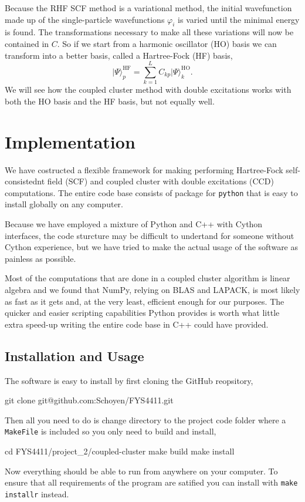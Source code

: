 \documentclass[
    a4paper, aps, twocolumn, floatfix, superscriptaddress,
    nofootinbib]{revtex4-1}
\newcommand{\1}{\mathds{1}}
\newcommand{\ket}[1]{\rvert #1\rangle}
\begin{document}
            Because the RHF SCF method is a variational method, the initial
            wavefunction made up of the single-particle wavefunctions $\varphi_i$
            is varied until the minimal energy is found. The transformations necessary
            to make all these variations will now be contained in $C$. So if we start from
            a harmonic oscillator (HO) basis we can transform into a better basis, called a
            Hartree-Fock (HF) basis,
            \begin{equation}
                \ket{\Psi}^{\text{HF}}_p = \sum_{k=1}^L C_{kp} \ket{\Psi}_k^{\text{HO}}.
            \end{equation}
            We will see how the coupled cluster method with double excitations works with
            both the HO basis and the HF basis, but not equally well.

\section{Implementation}
    We have costructed a flexible framework for making performing Hartree-Fock 
    self-consistednt field (SCF) and coupled cluster with double excitations (CCD)
    computations. The entire code base consists of package for \lstinline{python}
    that is easy to install globally on any computer.
    
    Because we have employed a mixture of Python and C++ with Cython interfaces,
    the code sturcture may be difficult to undertand for someone without Cython
    experience, but we have tried to make the actual usage of the software as
    painless as possible.

    Most of the computations that are done in a coupled cluster algorithm
    is linear algebra and we found that NumPy, relying on
    BLAS and LAPACK, is most likely as fast as it gets and, at the very least,
    efficient enough for our purposes. The quicker and easier scripting capabilities
    Python provides is worth what little extra speed-up writing the entire
    code base in C++ could have provided. 
    
    \subsection{Installation and Usage}

        The software is easy to install by first cloning the GitHub reopsitory,
        \begin{bash}
            git clone git@github.com:Schoyen/FYS4411.git
        \end{bash}
        Then all you need to do is change directory to the project code folder
        where a \lstinline{MakeFile} is included so you only need to build and
        install,
        \begin{bash}
            cd FYS4411/project_2/coupled-cluster
            make build
            make install
        \end{bash}
        Now everything should be able to run from anywhere on your computer.
        To ensure that all requirements of the program are satified you can
        install with \texttt{make installr} instead.
\end{document}
